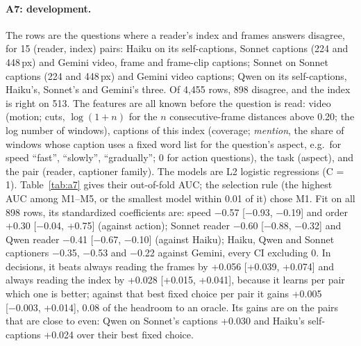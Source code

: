 \documentclass[11pt]{article}
\begin{document}
\paragraph{A7: development.} The rows are the questions where a reader's index and frames answers disagree, for 15 (reader, index) pairs: Haiku on its self-captions, Sonnet captions (224 and 448\,px) and Gemini video, frame and frame-clip captions; Sonnet on Sonnet captions (224 and 448\,px) and Gemini video captions; Qwen on its self-captions, Haiku's, Sonnet's and Gemini's three. Of 4,455 rows, 898 disagree, and the index is right on 513. The features are all known before the question is read: video (motion; cuts, $\log(1 + n)$ for the $n$ consecutive-frame distances above 0.20; the log number of windows), captions of this index (coverage; \emph{mention}, the share of windows whose caption uses a fixed word list for the question's aspect, e.g.\ for speed ``fast'', ``slowly'', ``gradually''; 0 for action questions), the task (aspect), and the pair (reader, captioner family). The models are L2 logistic regressions (C = 1). Table~\ref{tab:a7} gives their out-of-fold AUC; the selection rule (the highest AUC among M1--M5, or the smallest model within 0.01 of it) chose M1. Fit on all 898 rows, its standardized coefficients are: speed −0.57 [−0.93, −0.19] and order +0.30 [−0.04, +0.75] (against action); Sonnet reader −0.60 [−0.88, −0.32] and Qwen reader −0.41 [−0.67, −0.10] (against Haiku); Haiku, Qwen and Sonnet captioners −0.35, −0.53 and −0.22 against Gemini, every CI excluding 0. In decisions, it beats always reading the frames by +0.056 [+0.039, +0.074] and always reading the index by +0.028 [+0.015, +0.041], because it learns per pair which one is better; against that best fixed choice per pair it gains +0.005 [−0.003, +0.014], 0.08 of the headroom to an oracle. Its gains are on the pairs that are close to even: Qwen on Sonnet's captions +0.030 and Haiku's self-captions +0.024 over their best fixed choice.
\end{document}
